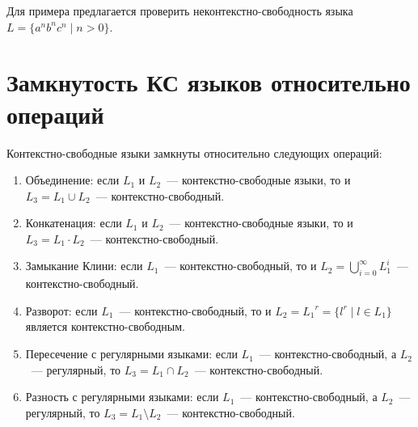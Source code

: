Для примера предлагается проверить неконтекстно-свободность языка $L=\{a^nb^nc^n \mid n>0\}$.

\section{Замкнутость КС языков относительно операций}

\begin{theorem}
    Контекстно-свободные языки замкнуты относительно следующих операций:
    \begin{enumerate}
        \item Объединение: если $L_1$ и $L_2$~--- контекстно-свободные языки, то и $L_3 = L_1 \cup L_2$~--- контекстно-свободный.
        \item Конкатенация: если $L_1$ и $L_2$~--- контекстно-свободные языки, то и $L_3 = L_1 \cdot L_2$~--- контекстно-свободный.
        \item Замыкание Клини: если $L_1$~--- контекстно-свободный, то и $L_2 = \bigcup\limits_{i=0}^{\infty} L_1^i $~--- контекстно-свободный.
        \item Разворот: если $L_1$~--- контекстно-свободный, то и $L_2 = {L_1}^r = \{ l^r \mid l \in L_1\}$ является контекстно-свободным.
        \item Пересечение с регулярными языками: если $L_1$~--- контекстно-свободный, а $L_2$~--- регулярный, то  $L_3 = L_1 \cap L_2$~--- контекстно-свободный.
        \item Разность с регулярными языками: если $L_1$~--- контекстно-свободный, а $L_2$~--- регулярный, то  $L_3 = L_1 \setminus L_2$~--- контекстно-свободный.
    \end{enumerate}
\end{theorem}
